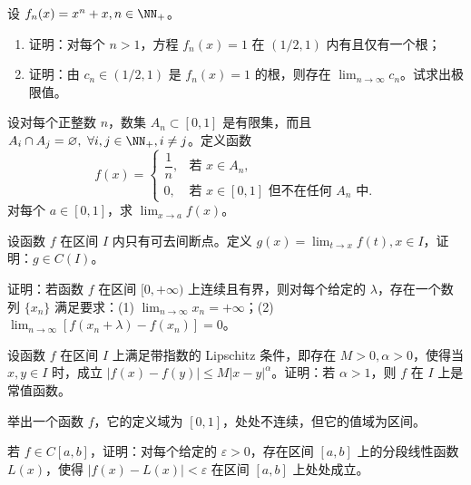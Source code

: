\begin{xreferenceproblem}[6]
设 $f_n(x)=x^n+x,n\in\NN_+$。
  \begin{enumerate}[label=(\arabic*)]
    \item 证明：对每个 $n>1$，方程 $f_n(x)=1$ 在 $(1/2,1)$ 内有且仅有一个根；
    \item 证明：由 $c_n\in(1/2,1)$ 是 $f_n(x)=1$ 的根，则存在 $\lim_{n\to\infty}c_n$。试求出极限值。
  \end{enumerate}
\end{xreferenceproblem}

\begin{xreferenceproblem}[7]
设对每个正整数 $n$，数集 $A_n\subset[0,1]$ 是有限集，而且 $A_i\cap A_j=\varnothing,\ \forall i,j\in\NN_+,i\ne j$。定义函数
  \[
    f(x)=\begin{cases}
      \dfrac1n,&\text{若 }x\in A_n,\\
      0,&\text{若 }x\in[0,1]\text{ 但不在任何 }A_n\text{ 中}.
    \end{cases}
  \]
  对每个 $a\in[0,1]$，求 $\lim_{x\to a}f(x)$。
\end{xreferenceproblem}

\begin{xreferenceproblem}[8]
设函数 $f$ 在区间 $I$ 内只有可去间断点。定义 $g(x)=\lim_{t\to x}f(t),x\in I$，证明：$g\in C(I)$。
\end{xreferenceproblem}

\begin{xreferenceproblem}[9]
证明：若函数 $f$ 在区间 $[0,+\infty)$ 上连续且有界，则对每个给定的 $\lambda$，存在一个数列 $\{x_n\}$ 满足要求：(1) $\lim_{n\to\infty}x_n=+\infty$；(2) $\lim_{n\to\infty}[f(x_n+\lambda)-f(x_n)]=0$。
\end{xreferenceproblem}

\begin{xreferenceproblem}[10]
设函数 $f$ 在区间 $I$ 上满足带指数的 Lipschitz 条件，即存在 $M>0,\alpha>0$，使得当 $x,y\in I$ 时，成立 $|f(x)-f(y)|\le M|x-y|^\alpha$。证明：若 $\alpha>1$，则 $f$ 在 $I$ 上是常值函数。
\end{xreferenceproblem}

\begin{xreferenceproblem}[11]
举出一个函数 $f$，它的定义域为 $[0,1]$，处处不连续，但它的值域为区间。
\end{xreferenceproblem}

\begin{xreferenceproblem}[12]
若 $f\in C[a,b]$，证明：对每个给定的 $\varepsilon>0$，存在区间 $[a,b]$ 上的分段线性函数 $L(x)$，使得 $|f(x)-L(x)|<\varepsilon$ 在区间 $[a,b]$ 上处处成立。
\end{xreferenceproblem}


